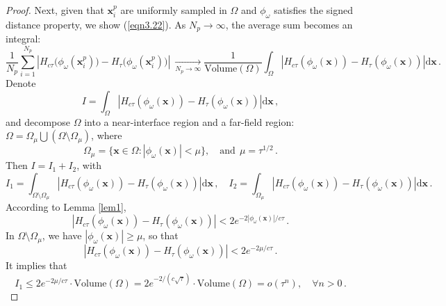 \documentclass[final,hidelinks,onefignum,onetabnum]{siamart251216}
\begin{document}
\begin{proof}
Next, given that $\mathbf{x}_i^p$ are uniformly sampled in $\Omega$ and $\phi_\omega$ satisfies the signed distance property, we show (\ref{eqn3.22}). As $N_p\to\infty$, the average sum becomes an integral:
\begin{equation*}
\frac{1}{N_p} \sum_{i=1}^{N_p} \left| H_{c\tau}\big(\phi_\omega(\mathbf{x}_i^p)\big) - H_\tau \big(\phi_\omega(\mathbf{x}_i^p)\big) \right|
\ \xrightarrow[N_p\to\infty]{} \frac{1}{\mathrm{Volume}(\Omega)} \int_{\Omega} \left| H_{c\tau}(\phi_\omega(\mathbf{x})) - H_\tau(\phi_\omega(\mathbf{x})) \right| \mathrm{d}\mathbf{x}\,.
\end{equation*}
Denote
\begin{equation}
I=\int_{\Omega} \left| H_{c\tau}(\phi_\omega(\mathbf{x})) - H_\tau(\phi_\omega(\mathbf{x})) \right| \mathrm{d}\mathbf{x}\,,
\end{equation}
and decompose $\Omega$ into a near-interface region and a far-field region: $\Omega=\Omega_\mu \bigcup \left(\Omega\!\setminus\!\Omega_\mu\right)$, where
\begin{equation}
\Omega_\mu=\{\mathbf{x}\in \Omega: |\phi_\omega(\mathbf{x})|<\mu\},\quad\mathrm{and}\ \ \mu=\tau^{1/2}\,.
\end{equation}
Then $I=I_1+I_2$, with
\begin{equation}
I_1=\int_{\Omega\setminus\Omega_\mu} \left| H_{c\tau}(\phi_\omega(\mathbf{x})) - H_\tau(\phi_\omega(\mathbf{x})) \right| \mathrm{d}\mathbf{x}\,,\quad  I_2=\int_{\Omega_\mu} \left| H_{c\tau}(\phi_\omega(\mathbf{x})) - H_\tau(\phi_\omega(\mathbf{x})) \right| \mathrm{d}\mathbf{x}\,.
\end{equation}
According to Lemma \ref{lem1},
\begin{equation}
\left| H_{c\tau}(\phi_\omega(\mathbf{x})) - H_\tau(\phi_\omega(\mathbf{x})) \right|<2 e^{-2 |\phi_\omega(\mathbf{x}) |/c\tau}\,.
\end{equation}
In $\Omega\setminus\Omega_\mu$, we have $|\phi_\omega(\mathbf{x})|\ge\mu$, so that
\begin{equation}
\left| H_{c\tau}(\phi_\omega(\mathbf{x})) - H_\tau(\phi_\omega(\mathbf{x})) \right|<2 e^{-2 \mu /c\tau}\,.
\end{equation}
It implies that
\begin{equation} \label{eqn3.28}
I_1\le 2 e^{-2 \mu /c\tau}\cdot \mathrm{Volume}(\Omega) = 2 e^{-2/(c\sqrt{\tau})}\cdot \mathrm{Volume}(\Omega) =o(\tau^n), \quad \forall n>0\,.
\end{equation}


\end{proof}
\end{document}
